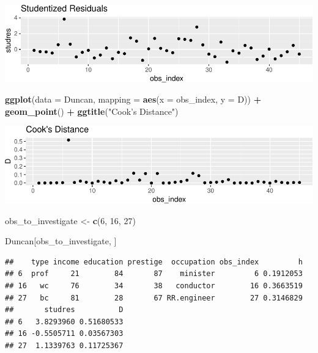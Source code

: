 \documentclass[]{extarticle}
\newenvironment{Shaded}{\begin{snugshade}}{\end{snugshade}}
\newcommand{\KeywordTok}[1]{\textcolor[rgb]{0.13,0.29,0.53}{\textbf{#1}}}
\newcommand{\DataTypeTok}[1]{\textcolor[rgb]{0.13,0.29,0.53}{#1}}
\newcommand{\DecValTok}[1]{\textcolor[rgb]{0.00,0.00,0.81}{#1}}
\newcommand{\StringTok}[1]{\textcolor[rgb]{0.31,0.60,0.02}{#1}}
\newcommand{\OperatorTok}[1]{\textcolor[rgb]{0.81,0.36,0.00}{\textbf{#1}}}
\newcommand{\NormalTok}[1]{#1}
\begin{document}
\includegraphics{20190417_avPlots_files/figure-latex/unnamed-chunk-12-2.pdf}

\begin{Shaded}
\begin{Highlighting}[]
\KeywordTok{ggplot}\NormalTok{(}\DataTypeTok{data =}\NormalTok{ Duncan, }\DataTypeTok{mapping =} \KeywordTok{aes}\NormalTok{(}\DataTypeTok{x =}\NormalTok{ obs_index, }\DataTypeTok{y =}\NormalTok{ D)) }\OperatorTok{+}
\StringTok{  }\KeywordTok{geom_point}\NormalTok{() }\OperatorTok{+}
\StringTok{  }\KeywordTok{ggtitle}\NormalTok{(}\StringTok{"Cook's Distance"}\NormalTok{)}
\end{Highlighting}
\end{Shaded}

\includegraphics{20190417_avPlots_files/figure-latex/unnamed-chunk-12-3.pdf}

\begin{Shaded}
\begin{Highlighting}[]
\NormalTok{obs_to_investigate <-}\StringTok{ }\KeywordTok{c}\NormalTok{(}\DecValTok{6}\NormalTok{, }\DecValTok{16}\NormalTok{, }\DecValTok{27}\NormalTok{)}
\end{Highlighting}
\end{Shaded}

\newpage

\begin{Shaded}
\begin{Highlighting}[]
\NormalTok{Duncan[obs_to_investigate, ]}
\end{Highlighting}
\end{Shaded}

\begin{verbatim}
##    type income education prestige  occupation obs_index         h
## 6  prof     21        84       87    minister         6 0.1912053
## 16   wc     76        34       38   conductor        16 0.3663519
## 27   bc     81        28       67 RR.engineer        27 0.3146829
##       studres          D
## 6   3.8293960 0.51680533
## 16 -0.5505711 0.03567303
## 27  1.1339763 0.11725367
\end{verbatim}
\end{document}
